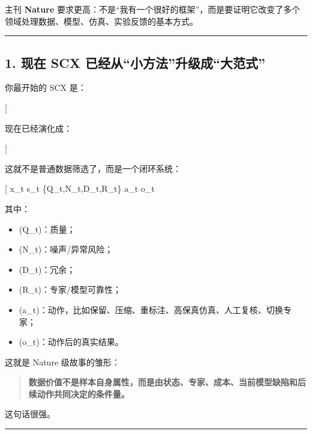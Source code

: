 \documentclass[
  12pt,
]{ctexart}
\providecommand{\tightlist}{%
  \setlength{\itemsep}{0pt}\setlength{\parskip}{0pt}}
\begin{document}
主刊 \textbf{Nature}
要求更高：不是``我有一个很好的框架''，而是要证明它改变了多个领域处理数据、模型、仿真、实验反馈的基本方式。

\begin{center}\rule{0.5\linewidth}{0.5pt}\end{center}

\subsection{1. 现在 SCX
已经从``小方法''升级成``大范式''}\label{ux73b0ux5728-scx-ux5df2ux7ecfux4eceux5c0fux65b9ux6cd5ux5347ux7ea7ux6210ux5927ux8303ux5f0f}

你最开始的 SCX 是：

{[}  \rightarrow \text{质量/冗余/噪声/价值判断}{]}

现在已经演化成：

{[}  \rightarrow {} \rightarrow
{} \rightarrow {} \rightarrow {}
\rightarrow \text{持续校准}{]}

这就不是普通数据筛选了，而是一个闭环系统：

{[} x\_t \rightarrow s\_t \rightarrow \{Q\_t,N\_t,D\_t,R\_t\}
\rightarrow a\_t \rightarrow o\_t \rightarrow \text{SCX update}{]}

其中：

\begin{itemize}
\tightlist
\item
  (Q\_t)：质量；
\item
  (N\_t)：噪声/异常风险；
\item
  (D\_t)：冗余；
\item
  (R\_t)：专家/模型可靠性；
\item
  (a\_t)：动作，比如保留、压缩、重标注、高保真仿真、人工复核、切换专家；
\item
  (o\_t)：动作后的真实结果。
\end{itemize}

这就是 Nature 级故事的雏形：

\begin{quote}
\textbf{数据价值不是样本自身属性，而是由状态、专家、成本、当前模型缺陷和后续动作共同决定的条件量。}
\end{quote}

这句话很强。

\begin{center}\rule{0.5\linewidth}{0.5pt}\end{center}
\end{document}
